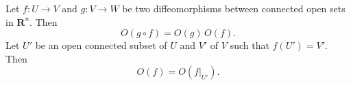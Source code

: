 Let $f: U \to V$ and $g: V \to W$ be two diffeomorphisms between connected open sets in $\mathbf{R}^n$. Then
$$O(g \circ f) = O(g)\,O(f).$$
Let $U'$ be an open connected subset of $U$ and $V'$ of $V$ such that $f(U') = V'$. Then
$$O(f) = O(f|_{U'}).$$
